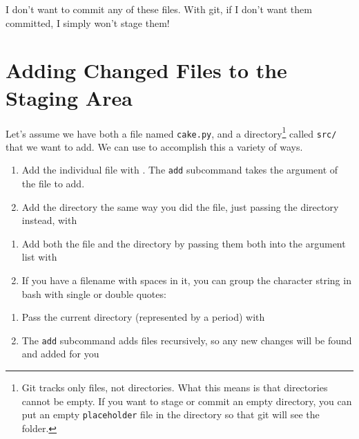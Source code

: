 \documentclass[11pt,letterpaper,twoside]{report}
\begin{document}
I don't want to commit any of these files. With git, if I don't want them
committed, I simply won't stage them! \cite{git-magic}

\section{Adding Changed Files to the Staging Area}
Let's assume we have both a file named \texttt{cake.py}, and a
directory\footnote{Git tracks only files, not directories. What this means is
that directories cannot be empty. If you want to stage or commit an empty
directory, you can put an empty \texttt{placeholder} file in the directory so
that git will see the folder.} called \texttt{src/} that we want to add. We can
use  to accomplish this a variety of ways.

\vspace{.5em}\noindent
{}
\begin{enumerate}
\item Add the individual file with . The \texttt{add}
    subcommand takes the argument of the file to add.
\item Add the directory the same way you did the file, just passing the
    directory instead, with 
\end{enumerate}

\noindent
{}
\begin{enumerate}
\item Add both the file and the directory by passing them both into the argument
    list with 
\item If you have a filename with spaces in it, you can group the character
    string in bash with single or double quotes:
\end{enumerate}

\noindent
{}
\begin{enumerate}
\item Pass the current directory (represented by a period) with
\item The \texttt{add} subcommand adds files recursively, so any new changes
    will be found and added for you
\end{enumerate}

\end{document}

